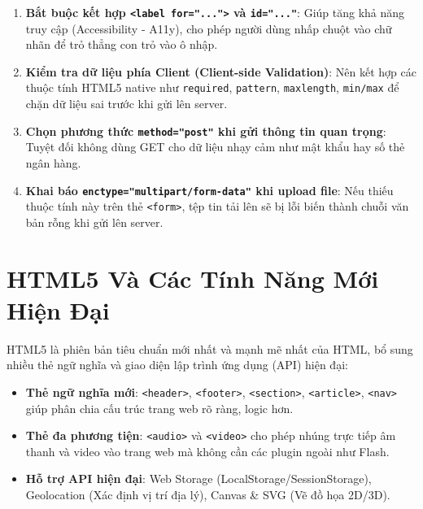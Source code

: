 \documentclass[11pt,oneside]{book}
\newcommand{\codeinline}[1]{\textcolor{accentOrange}{\texttt{#1}}}
\newcommand{\term}[1]{\textbf{\textcolor{primaryBlue}{#1}}}
\begin{document}
\begin{noteBox}
\begin{enumerate}[leftmargin=1.5em, itemsep=3pt, parsep=0pt]
    \item \textbf{Bắt buộc kết hợp \codeinline{<label for="...">} và \codeinline{id="..."}}: Giúp tăng khả năng truy cập (Accessibility - A11y), cho phép người dùng nhấp chuột vào chữ nhãn để trỏ thẳng con trỏ vào ô nhập.
    \item \textbf{Kiểm tra dữ liệu phía Client (\term{Client-side Validation})}: Nên kết hợp các thuộc tính HTML5 native như \codeinline{required}, \codeinline{pattern}, \codeinline{maxlength}, \codeinline{min/max} để chặn dữ liệu sai trước khi gửi lên server.
    \item \textbf{Chọn phương thức \codeinline{method="post"} khi gửi thông tin quan trọng}: Tuyệt đối không dùng GET cho dữ liệu nhạy cảm như mật khẩu hay số thẻ ngân hàng.
    \item \textbf{Khai báo \codeinline{enctype="multipart/form-data"} khi upload file}: Nếu thiếu thuộc tính này trên thẻ \codeinline{<form>}, tệp tin tải lên sẽ bị lỗi biến thành chuỗi văn bản rỗng khi gửi lên server.
\end{enumerate}
\end{noteBox}

\section{HTML5 Và Các Tính Năng Mới Hiện Đại}
\label{sec:html5_new_features}

HTML5 là phiên bản tiêu chuẩn mới nhất và mạnh mẽ nhất của HTML, bổ sung nhiều thẻ ngữ nghĩa và giao diện lập trình ứng dụng (API) hiện đại:

\begin{itemize}[leftmargin=1.8em, itemsep=3pt, parsep=0pt]
    \item \textbf{Thẻ ngữ nghĩa mới}: \codeinline{<header>}, \codeinline{<footer>}, \codeinline{<section>}, \codeinline{<article>}, \codeinline{<nav>} giúp phân chia cấu trúc trang web rõ ràng, logic hơn.
    \item \textbf{Thẻ đa phương tiện}: \codeinline{<audio>} và \codeinline{<video>} cho phép nhúng trực tiếp âm thanh và video vào trang web mà không cần các plugin ngoài như Flash.
    \item \textbf{Hỗ trợ API hiện đại}: Web Storage (LocalStorage/SessionStorage), Geolocation (Xác định vị trí địa lý), Canvas \& SVG (Vẽ đồ họa 2D/3D).
\end{itemize}
\end{document}

